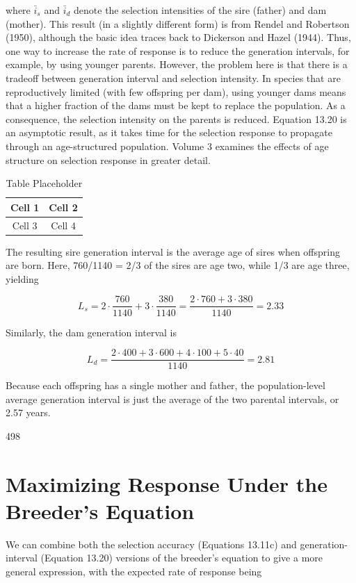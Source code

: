 \documentclass{article}
\begin{document}
where  $ \bar{i}_{s} $ and  $ \bar{i}_{d} $ denote the selection intensities of the sire (father) and dam (mother). This result (in a slightly different form) is from Rendel and Robertson (1950), although the basic idea traces back to Dickerson and Hazel (1944). Thus, one way to increase the rate of response is to reduce the generation intervals, for example, by using younger parents. However, the problem here is that there is a tradeoff between generation interval and selection intensity. In species that are reproductively limited (with few offspring per dam), using younger dams means that a higher fraction of the dams must be kept to replace the population. As a consequence, the selection intensity on the parents is reduced. Equation 13.20 is an asymptotic result, as it takes time for the selection response to propagate through an age-structured population. Volume 3 examines the effects of age structure on selection response in greater detail.

\begin{table}[h]
\centering
\begin{tabular}{|c|c|}
\hline
Cell 1 & Cell 2 \\
\hline
Cell 3 & Cell 4 \\
\hline
\end{tabular}
\caption{Table Placeholder}
\end{table}

The resulting sire generation interval is the average age of sires when offspring are born. Here, 760/1140 = 2/3 of the sires are age two, while 1/3 are age three, yielding

\begin{equation}
L_{s}=2\cdot\frac{760}{1140}+3\cdot\frac{380}{1140}=\frac{2\cdot760+3\cdot380}{1140}=2.33
\end{equation}

Similarly, the dam generation interval is

\begin{equation}
L_{d}=\frac{2\cdot400+3\cdot600+4\cdot100+5\cdot40}{1140}=2.81
\end{equation}

Because each offspring has a single mother and father, the population-level average generation interval is just the average of the two parental intervals, or 2.57 years.

498

\section{Maximizing Response Under the Breeder's Equation}
We can combine both the selection accuracy (Equations 13.11c) and generation-interval (Equation 13.20) versions of the breeder's equation to give a more general expression, with the expected rate of response being
\end{document}
